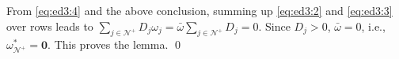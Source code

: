 \documentclass[journal,12pt,onecolumn,draftclsnofoot]{IEEEtran}
\begin{document}
From \eqref{eq:ed3:4} and the above conclusion, summing up \eqref{eq:ed3:2} and \eqref{eq:ed3:3} over rows leads to $\sum_{j\in\mathcal{N}^+} D_j\omega_j = \bar\omega \sum_{j\in\mathcal{N}^+} D_j=0$. Since $D_j>0$, $\bar \omega = 0$, i.e., $\omega_{\mathcal{N}^+}^*=\mathbf{0}$. This proves the lemma. \qed  


  
  
\end{document}
